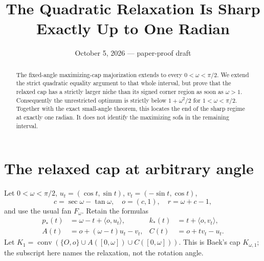\documentclass[11pt]{article}
\title{The Quadratic Relaxation Is Sharp Exactly Up to One Radian}
\author{}\date{October 5, 2026 --- paper-proof draft}
\newcommand{\ip}[2]{\langle #1,#2\rangle}
\begin{document}
\maketitle
\begin{abstract}
The fixed-angle maximizing-cap majorization extends to every $0<\omega<\pi/2$. We extend the strict quadratic equality argument to that whole interval, but prove that the relaxed cap has a strictly larger niche than its signed corner region as soon as $\omega>1$. Consequently the unrestricted optimum is strictly below $1+\omega^2/2$ for $1<\omega<\pi/2$. Together with the exact small-angle theorem, this locates the end of the sharp regime at exactly one radian. It does not identify the maximizing sofa in the remaining interval.
\end{abstract}

\section{The relaxed cap at arbitrary angle}
Let $0<\omega<\pi/2$, $u_t=(\cos t,\sin t)$, $v_t=(-\sin t,\cos t)$,
\[
 c=\sec\omega-\tan\omega,\quad o=(c,1),\quad r=\omega+c-1,
\]
and use the usual fan $F_\omega$. Retain the formulas
\begin{align*}
 p_*(t)&=\omega-t+\ip o{u_t},&k_*(t)&=t+\ip o{v_t},\\
 A(t)&=o+(\omega-t)u_t-v_t,&C(t)&=o+t v_t-u_t.
\end{align*}
Let $K_1=\operatorname{conv}(\{O,o\}\cup A([0,\omega])\cup C([0,\omega]))$. This is Baek's cap $K_{\omega,1}$; the subscript here names the relaxation, not the rotation angle.
\end{document}
